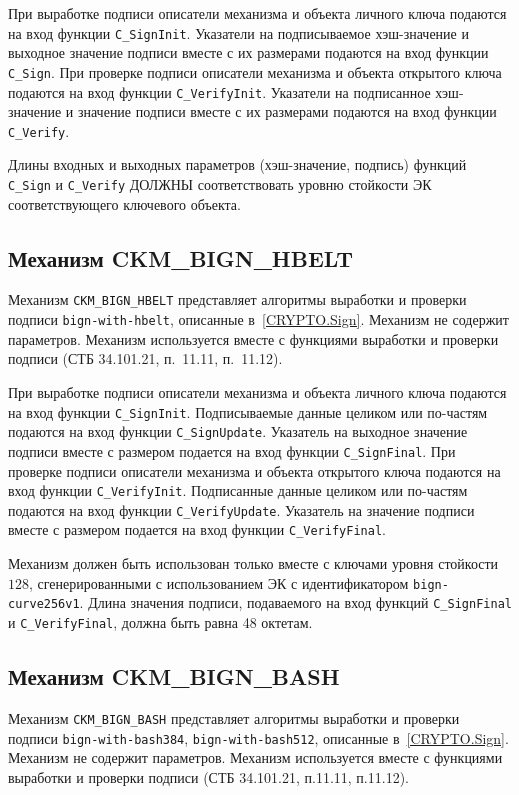 При выработке подписи описатели механизма и объекта
личного ключа подаются на вход функции \verb|C_SignInit|.
Указатели на подписываемое хэш-значение и выходное значение подписи
вместе с их размерами подаются на вход функции \verb|C_Sign|.
При проверке подписи описатели механизма и объекта
открытого ключа подаются на вход функции \verb|C_VerifyInit|.
Указатели на подписанное хэш-значение и значение подписи
вместе с их размерами подаются на вход функции \verb|C_Verify|.

Длины входных и выходных параметров (хэш-значение, подпись) функций
\verb|C_Sign| и \verb|C_Verify| ДОЛЖНЫ соответствовать
уровню стойкости ЭК соответствующего ключевого объекта.

\subsection{Механизм CKM\_BIGN\_HBELT}

Механизм
\verb|CKM_BIGN_HBELT| представляет алгоритмы выработки и проверки
подписи \texttt{bign-with-hbelt}, описанные в~\ref{CRYPTO.Sign}.
Механизм не содержит параметров. Механизм используется вместе с функциями 
выработки и проверки подписи (СТБ 34.101.21, п.~11.11, п.~11.12).

При выработке подписи описатели механизма и объекта
личного ключа подаются на вход функции \verb|C_SignInit|.
Подписываемые данные целиком или по-частям подаются
на вход функции \verb|C_SignUpdate|.
Указатель на выходное значение подписи вместе с размером
подается на вход функции \verb|C_SignFinal|.
При проверке подписи описатели механизма и объекта
открытого ключа подаются на вход функции \verb|C_VerifyInit|.
Подписанные данные целиком или по-частям подаются
на вход функции \verb|C_VerifyUpdate|.
Указатель на значение подписи вместе с размером
подается на вход функции \verb|C_VerifyFinal|.

Механизм должен быть использован только вместе с ключами
уровня стойкости $128$, сгенерированными с использованием 
ЭК с идентификатором \verb|bign-curve256v1|.
Длина значения подписи, подаваемого на вход функций
\verb|C_SignFinal| и \verb|C_VerifyFinal|, должна быть равна
48 октетам.

\subsection{Механизм CKM\_BIGN\_BASH}

Механизм
\verb|CKM_BIGN_BASH| представляет алгоритмы выработки и проверки
подписи \texttt{bign-with-bash384}, \texttt{bign-with-bash512},
описанные в~\ref{CRYPTO.Sign}.
Механизм не содержит параметров.
Механизм используется вместе с функциями выработки и
проверки подписи (СТБ 34.101.21, п.11.11, п.11.12).

